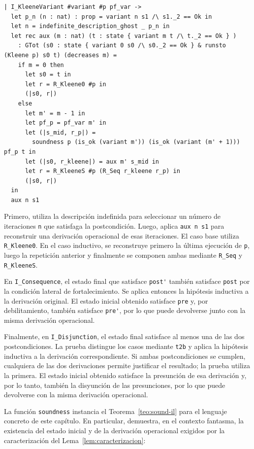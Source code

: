 \documentclass[a4paper,	11pt]{report}
\newif\ifdraft\drafttrue
\newcommand{\comm}[3]{\ifdraft{{\color{#1}[#2: #3]}}\fi}
\newcommand{\guido}[1]{\comm{blue}{Guido}{#1}}
\begin{document}
\begin{lstlisting}
| I_KleeneVariant #variant #p pf_var ->
  let p_n (n : nat) : prop = variant n s1 /\ s1._2 == Ok in
  let n = indefinite_description_ghost _ p_n in
  let rec aux (m : nat) (t : state { variant m t /\ t._2 == Ok } )
    : GTot (s0 : state { variant 0 s0 /\ s0._2 == Ok } & runsto (Kleene p) s0 t) (decreases m) =
    if m = 0 then
      let s0 = t in
      let r = R_Kleene0 #p in
      (|s0, r|)
    else 
      let m' = m - 1 in
      let pf_p = pf_var m' in
      let (|s_mid, r_p|) =
        soundness p (is_ok (variant m')) (is_ok (variant (m' + 1))) pf_p t in
      let (|s0, r_kleene|) = aux m' s_mid in
      let r = R_KleeneS #p (R_Seq r_kleene r_p) in
      (|s0, r|)
  in
  aux n s1
\end{lstlisting}
Primero,
utiliza la descripción indefinida para seleccionar un número de iteraciones \lstinline|n| que satisfaga la postcondición.
Luego,
aplica \lstinline|aux n s1| para reconstruir una derivación operacional de esas iteraciones.
El caso base utiliza \lstinline|R_Kleene0|.
En el caso inductivo,
se reconstruye primero la última ejecución de \lstinline|p|,
luego la repetición anterior y finalmente se componen ambas mediante \lstinline|R_Seq| y \lstinline|R_KleeneS|.

En \lstinline|I_Consequence|,
el estado final que satisface \lstinline|post'| también satisface \lstinline|post| por la condición lateral de fortalecimiento.
Se aplica entonces la hipótesis inductiva a la derivación original.
El estado inicial obtenido satisface \lstinline|pre| y,
por debilitamiento, 
también satisface \lstinline|pre'|,
por lo que puede devolverse junto con la misma derivación operacional.

Finalmente,
en \lstinline|I_Disjunction|,
el estado final satisface al menos una de las dos postcondiciones.
La prueba distingue los casos mediante \lstinline|t2b| y aplica la hipótesis inductiva a la derivación correspondiente.
Si ambas postcondiciones se cumplen,
cualquiera de las dos derivaciones permite justificar el resultado;
la prueba utiliza la primera.
El estado inicial obtenido satisface la presunción de esa derivación y,
por lo tanto,
también la disyunción de las presunciones,
por lo que puede devolverse con la misma derivación operacional.

La función \lstinline|soundness| instancia el Teorema~\ref{teo:sound-il} para el lenguaje concreto de este capítulo.
En particular,
demuestra,
en el contexto fantasma,
la existencia del estado inicial y de la derivación operacional
exigidos por la caracterización del Lema~\ref{lem:caracterizacion}:
\end{document}
